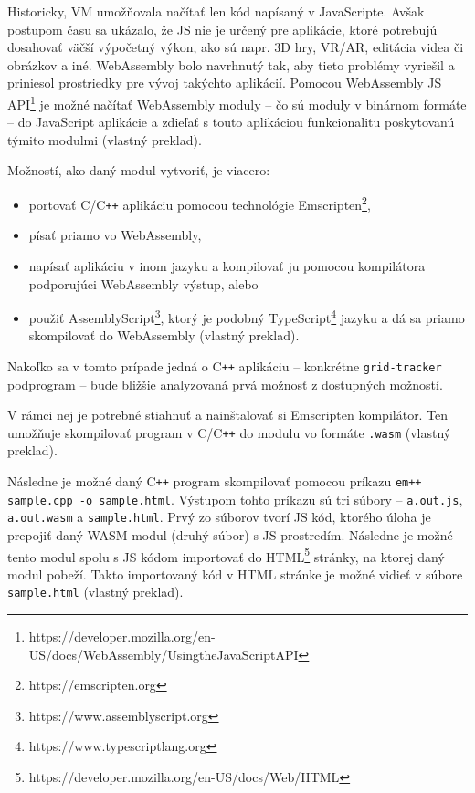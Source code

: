 Historicky, VM umožňovala načítať len kód napísaný v JavaScripte. Avšak postupom času sa ukázalo, že JS nie je určený pre aplikácie, ktoré potrebujú dosahovať väčší výpočetný výkon, ako sú napr. 3D hry, VR/AR, editácia videa či obrázkov a iné.
WebAssembly bolo navrhnutý tak, aby tieto problémy vyriešil a priniesol prostriedky pre vývoj takýchto aplikácií. 
Pomocou WebAssembly JS API\footnote{https://developer.mozilla.org/en-US/docs/WebAssembly/Using\textunderscore the\textunderscore JavaScript\textunderscore API} je možné načítať WebAssembly moduly -- čo sú moduly v binárnom formáte -- do JavaScript aplikácie a zdieľať s touto aplikáciou funkcionalitu poskytovanú týmito modulmi \cite{webassembly_concepts} (vlastný preklad).

Možností, ako daný modul vytvoriť, je viacero:
\begin {itemize}
\item {portovať C/C\texttt{++} aplikáciu pomocou technológie Emscripten\footnote{https://emscripten.org},}
\item {písať priamo vo WebAssembly,}
\item {napísať aplikáciu v inom jazyku a kompilovať ju pomocou kompilátora podporujúci WebAssembly výstup, alebo}
\item {použiť AssemblyScript\footnote{https://www.assemblyscript.org}, ktorý je podobný TypeScript\footnote{https://www.typescriptlang.org} jazyku a dá sa priamo skompilovať do WebAssembly  \cite{webassembly_concepts} (vlastný preklad).}
\end {itemize}

Nakoľko sa v tomto prípade jedná o C\texttt{++} aplikáciu -- konkrétne \texttt{grid-tracker} podprogram -- bude bližšie analyzovaná prvá možnosť z dostupných možností.

V rámci nej je potrebné stiahnuť a nainštalovať si Emscripten kompilátor. Ten umožňuje skompilovať program v C/C\texttt{++} do modulu vo formáte \texttt{.wasm} \cite{cpp_to_wasm} (vlastný preklad).

Následne je možné daný C\texttt{++} program skompilovať pomocou príkazu \texttt{em++ sample.cpp -o sample.html}. Výstupom tohto príkazu sú tri súbory -- \texttt{a.out.js}, \texttt{a.out.wasm} a \texttt{sample.html}. Prvý zo súborov tvorí JS kód, ktorého úloha je prepojiť daný WASM modul (druhý súbor) s JS prostredím. Následne je možné tento modul spolu s JS kódom importovať do HTML\footnote{https://developer.mozilla.org/en-US/docs/Web/HTML} stránky, na ktorej daný modul pobeží. Takto importovaný kód v HTML stránke je možné vidieť v súbore \texttt{sample.html} \cite{cpp_to_wasm} (vlastný preklad).

